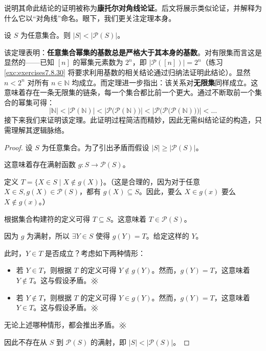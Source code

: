 说明其命此结论的证明被称为\textbf{康托尔对角线论证}。后文将展示类似论证，并解释为什么它以``对角线''命名。眼下，我们更关注定理本身。

\begin{theorem}
    设 $S$ 为任意集合。则 $|S| < |\mathcal{P}(S)|$。
\end{theorem}

该定理表明：\textbf{任意集合幂集的基数总是严格大于其本身的基数}。对有限集而言这是显然的——已知 $[n]$ 的幂集元素数为 $2^n$，即 $|\mathcal{P}([n])| = 2^n$（练习 \ref{exc:exercises7.8.30} 将要求利用基数的相关结论通过归纳法证明此结论）。显然 $n < 2^n$ 对所有 $n \in \mathbb{N}$ 均成立。而定理进一步指出：该关系对\textbf{无限集}同样成立。这意味着存在一条无限集的链条，每一个集合都比前一个更大。通过不断取前一个集合的幂集可得：
\[|\mathbb{N}| < |\mathcal{P}(\mathbb{N})| < \big|\mathcal{P}\big(\mathcal{P}(\mathbb{N})\big)\big| < \Big|\mathcal{P}\Big(\mathcal{P}\big(\mathcal{P}(\mathbb{N})\big)\Big)\Big| < \dots
\]
接下来我们来证明该定理。此证明过程简洁而精妙，因此无需纠结论证的构造，只需理解其逻辑脉络。

\begin{proof}
    设 $S$ 为任意集合。为了引出矛盾而假设 $|S| \ge |\mathcal{P}(S)|$。

    这意味着存在满射函数 $g : S \to \mathcal{P}(S)$。

    定义 $T = \{X \in S \mid X \notin g(X)\}$。（这是合理的，因为对于任意 $X \in S, g(X) \in \mathcal{P}(S)$，都有 $g(X) \subseteq S$。因此，要么 $X \in g(x)$ 要么 $X \notin g(x)$。）

    根据集合构建符的定义可得 $T \subseteq S$。这意味着 $T \in \mathcal{P}(S)$。

    因为 $g$ 为满射，所以 $\exists Y \in S$ 使得 $g(Y) = T$。给定这样的 $Y$。

    此时，$Y \in T$ 是否成立？考虑如下两种情形：
    \begin{itemize}
        \item 若 $Y \in T$，则根据 $T$ 的定义可得 $Y \notin g(Y)$。然而，$g(Y) = T$，这意味着 $Y \notin T$。这与假设矛盾。$\hashx$
        \item 若 $Y \notin T$，则根据 $T$ 的定义可得 $Y \in g(Y)$。然而，$g(Y) = T$，这意味着 $Y \in T$。这与假设矛盾。$\hashx$
    \end{itemize}
    
    无论上述哪种情形，都会推出矛盾。$\hashx$

    因此不存在从 $S$ 到 $\mathcal{P}(S)$ 的满射，即 $|S| < |\mathcal{P}(S)|$。
\end{proof}

